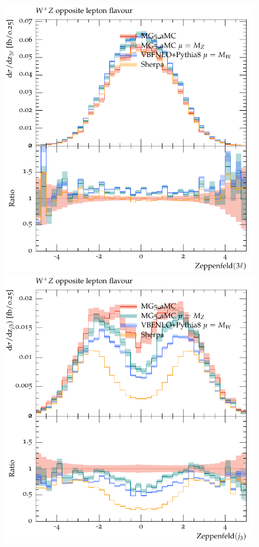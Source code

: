 \begin{figure}[htbp]
\begin{center}
   \includegraphics[scale=0.65]{figs/WpZ_OF_zep3l}
   \includegraphics[scale=0.65]{figs/WpZ_OF_zepj3}

\end{center}
\end{figure}
